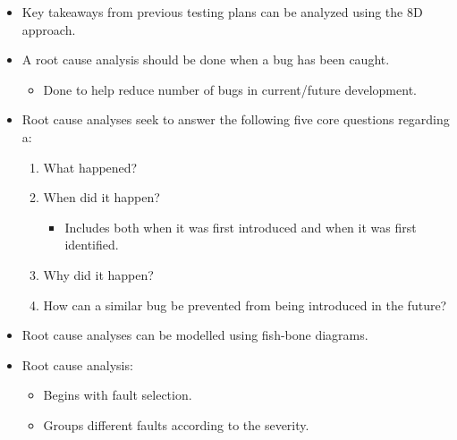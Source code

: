 \documentclass{article}
\begin{document}
\begin{itemize}
	\begin{enumerate}
		\item The plan.
		\item Business and structural function testing.
		\item An interface test description.
		\item Test progression.
	\end{enumerate}
	\item Key takeaways from previous testing plans can be analyzed using the 8D approach.
	\item A root cause analysis should be done when a bug has been caught.
	\begin{itemize}
		\item Done to help reduce number of bugs in current/future development.
	\end{itemize}
	\item Root cause analyses seek to answer the following five core questions regarding a:
	\begin{enumerate}
		\item What happened?
		\item When did it happen?
		\begin{itemize}
			\item Includes both when it was first introduced and when it was first identified.
		\end{itemize}
		\item Why did it happen?
		\item How can a similar bug be prevented from being introduced in the future?
	\end{enumerate}
	\item Root cause analyses can be modelled using fish-bone diagrams.
	\item Root cause analysis:
	\begin{itemize}
		\item Begins with fault selection.
		\item Groups different faults according to the severity.
	\end{itemize}
\end{itemize}

\ifdefined\iscombined
	\newpage
\else
	
\end{document}
